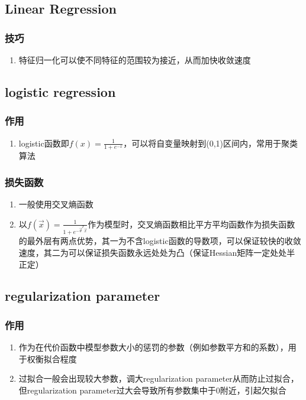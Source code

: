 \documentclass[onecolumn]{article}
\begin{document}
    \subsection{Linear Regression}
        \subsubsection{技巧}
            \noindent
            \begin{enumerate}
                \item 特征归一化可以使不同特征的范围较为接近，从而加快收敛速度
            \end{enumerate}
    \subsection{logistic regression}
        \subsubsection{作用}
            \noindent
            \begin{enumerate}
                \item logistic函数即$f(x)=\frac{1}{1+e^{-x}}$，可以将自变量映射到(0,1)区间内，常用于聚类算法
            \end{enumerate}
        \subsubsection{损失函数}
            \noindent
            \begin{enumerate}
                \item 一般使用交叉熵函数
                \item 以$f(\vec{x})=\frac{1}{1+e^{-\vec{\theta}^T\vec{x}}}$作为模型时，交叉熵函数相比平方平均函数作为损失函数的最外层有两点优势，其一为不含logistic函数的导数项，可以保证较快的收敛速度，其二为可以保证损失函数永远处处为凸（保证Hessian矩阵一定处处半正定）
            \end{enumerate}
    \subsection{regularization parameter}
        \subsubsection{作用}
            \noindent
            \begin{enumerate}
                \item 作为在代价函数中模型参数大小的惩罚的参数（例如参数平方和的系数），用于权衡拟合程度
                \item 过拟合一般会出现较大参数，调大regularization parameter从而防止过拟合，但regularization parameter过大会导致所有参数集中于0附近，引起欠拟合
            \end{enumerate}
\end{document}
